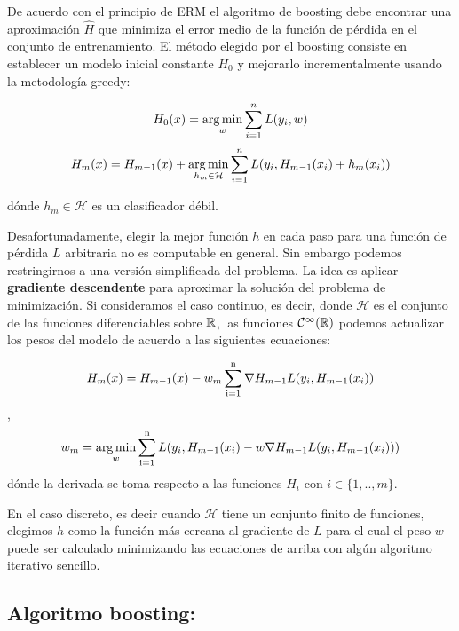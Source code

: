De acuerdo con el principio de ERM el algoritmo de boosting debe encontrar una aproximación $\hat{H}$ que minimiza el error medio de la función de pérdida en el conjunto de entrenamiento.  
El método elegido por el boosting consiste en establecer un modelo inicial constante $H_0$ y mejorarlo incrementalmente usando la metodología greedy:

$$ H_0(x) =  \operatorname*{arg\,min}_w \sum_{i=1}^n L(y_i, w) $$
$$ H_m(x) = H_{m-1}(x) + \operatorname*{arg\,min}_{h_m \in \mathcal{H}} \sum_{i=1}^n L(y_i,  H_{m-1}(x_i) + h_m(x_i))$$

dónde $h_m \in \mathcal{H}$ es un clasificador débil.  

Desafortunadamente, elegir la mejor función $h$ en cada paso para una función de pérdida $L$ arbitraria no es computable en general. Sin embargo podemos restringirnos a una versión simplificada del problema.
La idea es aplicar \textbf{gradiente descendente} para aproximar la solución del problema de minimización. 
Si consideramos el caso continuo, es decir, donde $\mathcal{H}$ es el conjunto de las funciones diferenciables sobre $\operatorname{\mathbb{R}}$, las funciones $\mathcal{C^1(\operatorname{\mathbb{R}})}$ podemos actualizar los pesos del modelo de acuerdo a las siguientes ecuaciones:

$$ H_m(x) = H_{m-1}(x) - w_m \operatorname{\sum_{i=1}^n} \nabla H_{m-1} L(y_i, H_{m-1}(x_i))$$,
$$ w_m = \operatorname*{arg\,min}_w \operatorname{\sum_{i=1}^n} L(y_i, H_{m-1}(x_i) - w \nabla H_{m-1} L(y_i, H_{m-1}(x_i)))$$
dónde la derivada se toma respecto a las funciones $H_i$ con $ i \in \{1,..,m\}$.  

En el caso discreto, es decir cuando $\mathcal{H}$ tiene un conjunto finito de funciones, elegimos $h$ como la función más cercana al gradiente de $L$ para el cual el peso $w$ puede ser calculado minimizando las ecuaciones de arriba con algún algoritmo iterativo sencillo.  




\pagebreak
\subsection*{Algoritmo boosting:}	 

\begin{algorithmic}
\State{}
\EndFor
\State{}
\end{algorithmic}


